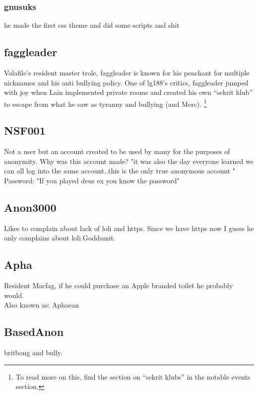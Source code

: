 \documentclass[12pt]{report}
\begin{document}
{{        \subsubsection{gnusuks}
        he made the first css theme and did some scripts and shit

        \subsection{faggleader}
        Volafile's resident master trole, faggleader is known for his penchant for
        multiple nicknames and his anti bullying policy. One of lg188's critics,
        faggleader jumped with joy when Lain implemented private rooms
        and created his own ``sekrit klub'' to escape from what
        he saw as tyranny and bullying (and Merc).
        \footnote{To read more on this, find the section on ``sekrit klubs'' in the notable events section.}

        \subsection{NSF001} %
        Not a user but an account created to be used by many for the purposes of anonymity.
        Why was this account made? "it was also the day everyone learned we
        can all log into the same account..this is the only true anonymous account " \\
        Password: "If you played deus ex you know the password"

        \subsection{Anon3000}
        Likes to complain about lack of loli and https. Since we have https now I guess he only complains about loli.Goddamit.

        \subsection{Apha}
        Resident Macfag, if he could purchase an Apple branded toilet he probably would. \\
        Also known as: Aphaean

        \subsection{BasedAnon}
        britbong and bully.

}}
\end{document}
